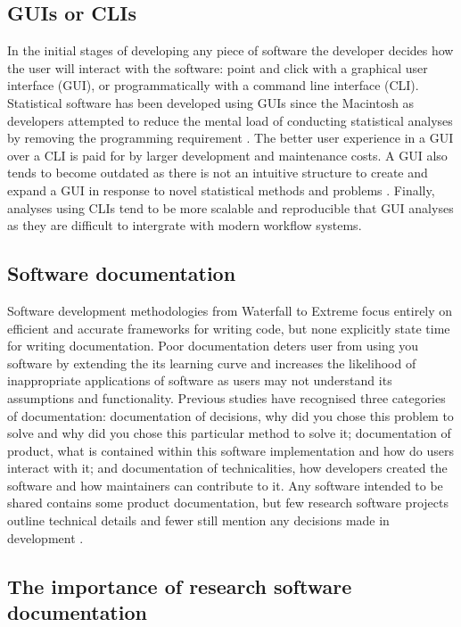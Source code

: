 \documentclass[../main.tex]{subfiles}
\begin{document}
\subsection{GUIs or CLIs}

In the initial stages of developing any piece of software the developer decides how the user will interact with the software: point and click with a graphical user interface (GUI), or programmatically with a command line interface (CLI).
Statistical software has been developed using GUIs since the Macintosh as developers attempted to reduce the mental load of conducting statistical analyses by removing the programming requirement \parencite{ValeroMora2012}. 
The better user experience in a GUI over a CLI \parencite{Staggers2000} is paid for by larger development and maintenance costs.
A GUI also tends to become outdated as there is not an intuitive structure to create and expand a GUI in response to novel statistical methods and problems \parencite{Unwin2012}.
Finally, analyses using CLIs tend to be more scalable and reproducible that GUI analyses as they are difficult to intergrate with modern workflow systems. 


\subsection{Software documentation}

Software development methodologies from Waterfall to Extreme focus entirely on efficient and accurate frameworks for writing code, but none explicitly state time for writing documentation. 
Poor documentation deters user from using you software by extending the its learning curve and increases the likelihood of inappropriate applications of software as users may not understand its assumptions and functionality.
Previous studies have recognised three categories of documentation: documentation of decisions, why did you chose this problem to solve and why did you chose this particular method to solve it; documentation of product, what is contained within this software implementation and how do users interact with it; and documentation of technicalities, how developers created the software and how maintainers can contribute to it. 
Any software intended to be shared contains some product documentation, but few research software projects outline technical details and fewer still mention any decisions made in development \parencite{Geiger2018}.

\subsection{The importance of research software documentation}
\end{document}
